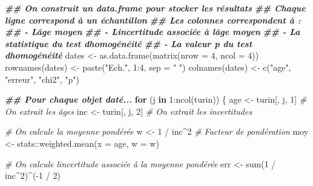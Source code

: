 \documentclass[
  french,
]{scrbook}
\newenvironment{Shaded}{\begin{snugshade}}{\end{snugshade}}
\newcommand{\AttributeTok}[1]{\textcolor[rgb]{0.77,0.63,0.00}{#1}}
\newcommand{\CommentTok}[1]{\textcolor[rgb]{0.56,0.35,0.01}{\textit{#1}}}
\newcommand{\ControlFlowTok}[1]{\textcolor[rgb]{0.13,0.29,0.53}{\textbf{#1}}}
\newcommand{\DecValTok}[1]{\textcolor[rgb]{0.00,0.00,0.81}{#1}}
\newcommand{\DocumentationTok}[1]{\textcolor[rgb]{0.56,0.35,0.01}{\textbf{\textit{#1}}}}
\newcommand{\FunctionTok}[1]{\textcolor[rgb]{0.00,0.00,0.00}{#1}}
\newcommand{\NormalTok}[1]{#1}
\newcommand{\OtherTok}[1]{\textcolor[rgb]{0.56,0.35,0.01}{#1}}
\newcommand{\SpecialCharTok}[1]{\textcolor[rgb]{0.00,0.00,0.00}{#1}}
\newcommand{\StringTok}[1]{\textcolor[rgb]{0.31,0.60,0.02}{#1}}
\begin{document}
\begin{Shaded}
\begin{Highlighting}[]
\DocumentationTok{\#\# On construit un data.frame pour stocker les résultats}
\DocumentationTok{\#\# Chaque ligne correspond à un échantillon}
\DocumentationTok{\#\# Les colonnes correspondent à :}
\DocumentationTok{\#\# {-} L\textquotesingle{}âge moyen}
\DocumentationTok{\#\# {-} L\textquotesingle{}incertitude associée à l\textquotesingle{}âge moyen}
\DocumentationTok{\#\# {-} La statistique du test d\textquotesingle{}homogénéité}
\DocumentationTok{\#\# {-} La valeur p du test d\textquotesingle{}homogénéité}
\NormalTok{dates }\OtherTok{\textless{}{-}} \FunctionTok{as.data.frame}\NormalTok{(}\FunctionTok{matrix}\NormalTok{(}\AttributeTok{nrow =} \DecValTok{4}\NormalTok{, }\AttributeTok{ncol =} \DecValTok{4}\NormalTok{))}
\FunctionTok{rownames}\NormalTok{(dates) }\OtherTok{\textless{}{-}} \FunctionTok{paste}\NormalTok{(}\StringTok{"Ech."}\NormalTok{, }\DecValTok{1}\SpecialCharTok{:}\DecValTok{4}\NormalTok{, }\AttributeTok{sep =} \StringTok{" "}\NormalTok{)}
\FunctionTok{colnames}\NormalTok{(dates) }\OtherTok{\textless{}{-}} \FunctionTok{c}\NormalTok{(}\StringTok{"age"}\NormalTok{, }\StringTok{"erreur"}\NormalTok{, }\StringTok{"chi2"}\NormalTok{, }\StringTok{"p"}\NormalTok{)}

\DocumentationTok{\#\# Pour chaque objet daté...}
\ControlFlowTok{for}\NormalTok{ (j }\ControlFlowTok{in} \DecValTok{1}\SpecialCharTok{:}\FunctionTok{ncol}\NormalTok{(turin)) \{}
\NormalTok{  age }\OtherTok{\textless{}{-}}\NormalTok{ turin[, j, }\DecValTok{1}\NormalTok{] }\CommentTok{\# On extrait les âges}
\NormalTok{  inc }\OtherTok{\textless{}{-}}\NormalTok{ turin[, j, }\DecValTok{2}\NormalTok{] }\CommentTok{\# On extrait les incertitudes}

  \CommentTok{\# On calcule la moyenne pondérée}
\NormalTok{  w }\OtherTok{\textless{}{-}} \DecValTok{1} \SpecialCharTok{/}\NormalTok{ inc}\SpecialCharTok{\^{}}\DecValTok{2} \CommentTok{\# Facteur de pondération}
\NormalTok{  moy }\OtherTok{\textless{}{-}}\NormalTok{ stats}\SpecialCharTok{::}\FunctionTok{weighted.mean}\NormalTok{(}\AttributeTok{x =}\NormalTok{ age, }\AttributeTok{w =}\NormalTok{ w)}

  \CommentTok{\# On calcule l\textquotesingle{}incertitude associée à la moyenne pondérée}
\NormalTok{  err }\OtherTok{\textless{}{-}} \FunctionTok{sum}\NormalTok{(}\DecValTok{1} \SpecialCharTok{/}\NormalTok{ inc}\SpecialCharTok{\^{}}\DecValTok{2}\NormalTok{)}\SpecialCharTok{\^{}}\NormalTok{(}\SpecialCharTok{{-}}\DecValTok{1} \SpecialCharTok{/} \DecValTok{2}\NormalTok{)}


\end{Highlighting}
\end{Shaded}
\end{document}
